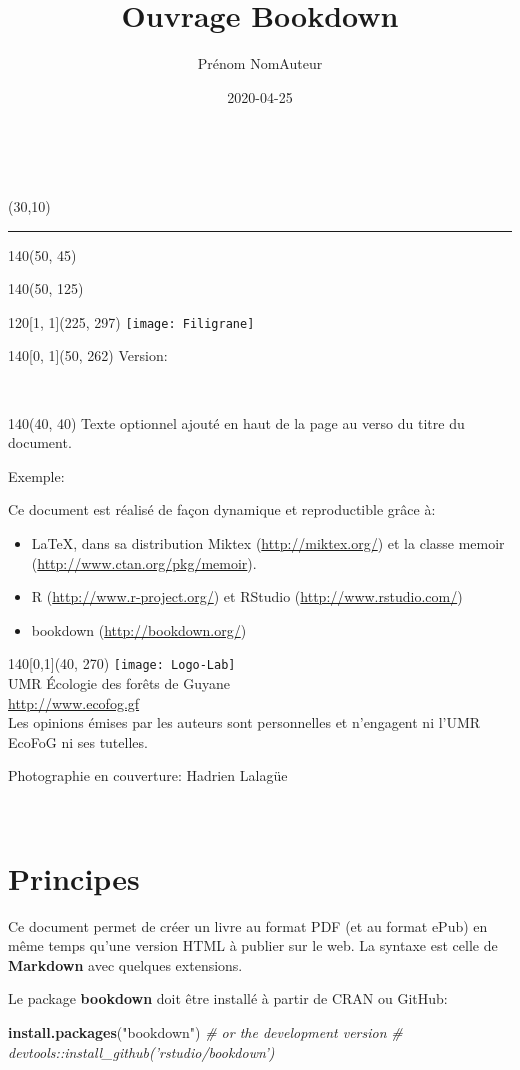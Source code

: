\documentclass[
  11pt,
  french,
  a4paper,
  extrafontsizes,onecolumn,openright
  ]{memoir}
\title{Ouvrage Bookdown}
\author{Prénom NomAuteur}
\date{2020-04-25}
\newenvironment{Shaded}{\begin{snugshade}}{\end{snugshade}}
\newcommand{\CommentTok}[1]{\textcolor[rgb]{0.56,0.35,0.01}{\textit{#1}}}
\newcommand{\KeywordTok}[1]{\textcolor[rgb]{0.13,0.29,0.53}{\textbf{#1}}}
\newcommand{\NormalTok}[1]{#1}
\newcommand{\StringTok}[1]{\textcolor[rgb]{0.31,0.60,0.02}{#1}}
\newcommand{\MainTitlePage}[1][]{
	\SmallMargins %
	\pagestyle{empty} %
	~\\ %
	\begin{textblock}{2}(30,10)
		\rule{1pt}{\paperheight-20mm}
	\end{textblock}
	\begin{textblock}{140}(50, 45)
		\flushright
		\begin{Spacing}{3}
			{\fontfamily{qtm}\selectfont\fontsize{45}{45}\selectfont \textsc{\thetitle}}
		\end{Spacing}
	\end{textblock}
	\begin{textblock}{140}(50, 125)
		\flushright
		{\fontfamily{qtm}\Large \theauthor}
	\end{textblock}
	\begin{textblock}{120}[1, 1](225, 297)
		\texttt{[image: Filigrane]}
	 \end{textblock}
	\begin{textblock}{140}[0, 1](50, 262)
		\normalfont	Version: \thedate
	\end{textblock}
	\newpage
	~\\ %
	\begin{textblock}{140}(40, 40)
		#1
	\end{textblock}
	\begin{textblock}{140}[0,1](40, 270)
		\centering
    \texttt{[image: Logo-Lab]}\\ \bigskip
		UMR \'Ecologie des forêts de Guyane\\
		\url{http://www.ecofog.gf}\\[3\baselineskip]
		Les opinions émises par les auteurs sont personnelles et n’engagent ni l’UMR EcoFoG ni ses tutelles.

    \tiny{Photographie en couverture: Hadrien Lalagüe}
	\end{textblock}
	\newpage
}
\begin{document}
\frontmatter


\MainTitlePage[Texte optionnel ajouté en haut de la page au verso du titre du document.

Exemple:

Ce document est réalisé de façon dynamique et reproductible grâce à:

\begin{itemize}
  \item \LaTeX, dans sa distribution Miktex (\url{http://miktex.org/}) et la classe memoir (\url{http://www.ctan.org/pkg/memoir}).
  \item R (\url{http://www.r-project.org/}) et RStudio (\url{http://www.rstudio.com/})
  \item bookdown (\url{http://bookdown.org/})
\end{itemize}]

\makeflyleaf
\newpage
~
\newpage









\LargeMargins
{
\hypersetup{linkcolor=}
\setcounter{tocdepth}{3}
\tableofcontents
}



\LargeMargins
\hypertarget{principes}{%
\chapter*{Principes}\label{principes}}

Ce document permet de créer un livre au format PDF (et au format ePub) en même temps qu'une version HTML à publier sur le web.
La syntaxe est celle de \textbf{Markdown} avec quelques extensions.

Le package \textbf{bookdown} doit être installé à partir de CRAN ou GitHub:

\scriptsize

\begin{Shaded}
\begin{Highlighting}[]
\KeywordTok{install.packages}\NormalTok{(}\StringTok{"bookdown"}\NormalTok{)}
\CommentTok{# or the development version}
\CommentTok{# devtools::install_github('rstudio/bookdown')}
\end{Highlighting}
\end{Shaded}
\end{document}
